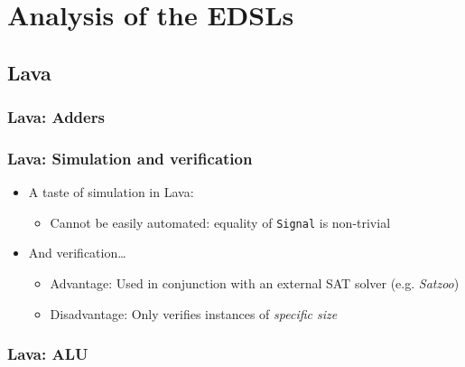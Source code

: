 \documentclass{beamer}
\begin{document}
    \section{Analysis of the EDSLs}
    \label{sec:analysis-of-the-edsls}
        \frame{\sectionpage}

        \subsection{Lava}
        \label{subsec:lava}

            \begin{frame}
                \frametitle{Lava: Adders}
            \end{frame}

            \begin{frame}
                \frametitle{Lava: Simulation and verification}

                \begin{itemize}
                    \item A taste of simulation in Lava:
                        \begin{itemize}
                            \item Cannot be easily automated: equality of \texttt{Signal} is non-trivial
                        \end{itemize}

                    \item And verification\ldots
                        \begin{itemize}
                            \item Advantage: Used in conjunction with an external SAT solver (e.g. \emph{Satzoo})
                            \item Disadvantage: Only verifies instances of \emph{specific size}
                        \end{itemize}
                \end{itemize}
            \end{frame}

            \begin{frame}
                \frametitle{Lava: ALU}
            \end{frame}
\end{document}
